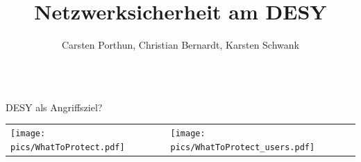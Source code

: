 \documentclass[final]{beamer}
\title{Netzwerksicherheit am DESY} %
\author{Carsten Porthun, Christian Bernardt, Karsten Schwank} %
\newlength{\sepwid}
\newlength{\twocolwid}
\begin{document}

\setlength{\belowcaptionskip}{2ex} %
\setlength\belowdisplayshortskip{2ex} %

\begin{frame}[t] %

\begin{columns}[b]

\begin{column}{0.95\textwidth}

\begin{alertblock}{DESY als Angriffsziel?}
\setlength{\tabcolsep}{2cm}
\begin{tabular*}{20cm}{ ll }

\begin{minipage}[t]{0.45\linewidth}
\texttt{[image: pics/WhatToProtect.pdf]}
\end{minipage}

&

\begin{minipage}[t]{0.45\linewidth}
\texttt{[image: pics/WhatToProtect\_users.pdf]}
\end{minipage}
\end{tabular*}

\end{alertblock}
\end{column}
\end{columns}

\begin{columns}[t, totalwidth=\textwidth] %

\begin{column}{\sepwid}\end{column} %

\begin{column}{\twocolwid} %



\end{column}
\end{columns}
\end{frame}
\end{document}
